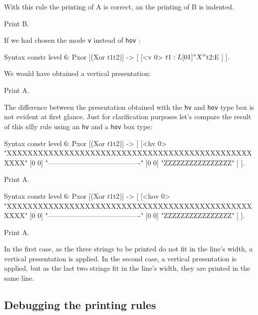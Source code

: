 \begin{enumerate}
With this rule the printing of A is correct, an the printing of B is
indented.

\begin{coq_example}
Print B.
\end{coq_example}

If we had chosen the mode \verb+v+ instead of \verb+hov+ :

\begin{coq_example*}
Syntax constr level 6:
  Pxor [(Xor $t1 $t2)] -> [ [<v 0> $t1:L [0 1] " X " $t2:E ] ].
\end{coq_example*}

We would have obtained a vertical presentation:

\begin{coq_example}
Print A.
\end{coq_example}

The difference between the presentation obtained with the \verb+hv+
and \verb+hov+ type box is not evident at first glance. Just for
clarification purposes let's compare the result of this silly rule
using an \verb+hv+ and a \verb+hov+ box type:

\begin{coq_example*}
Syntax constr level 6:
  Pxor [(Xor $t1 $t2)] ->
   [ [<hv 0> "XXXXXXXXXXXXXXXXXXXXXXXXXXXXXXXXXXXXXXXXXXXXXXXXXXX"
       [0 0] "----------------------------------------"
       [0 0] "ZZZZZZZZZZZZZZZZ" ] ].
\end{coq_example*}
\begin{coq_example}
Print A.
\end{coq_example}
\begin{coq_example*}
Syntax constr level 6:
  Pxor [(Xor $t1 $t2)] ->
   [ [<hov 0> "XXXXXXXXXXXXXXXXXXXXXXXXXXXXXXXXXXXXXXXXXXXXXXXXXXX"
       [0 0]  "----------------------------------------"
       [0 0]  "ZZZZZZZZZZZZZZZZ" ] ].
\end{coq_example*}
\begin{coq_example}
Print A.
\end{coq_example}

In the first case, as the three strings to be printed do not fit in
the line's width, a vertical presentation is applied. In the second
case, a vertical presentation is applied, but as the last two strings
fit in the line's width, they are printed in the same line.


\end{enumerate}

\subsection{Debugging the printing rules}

